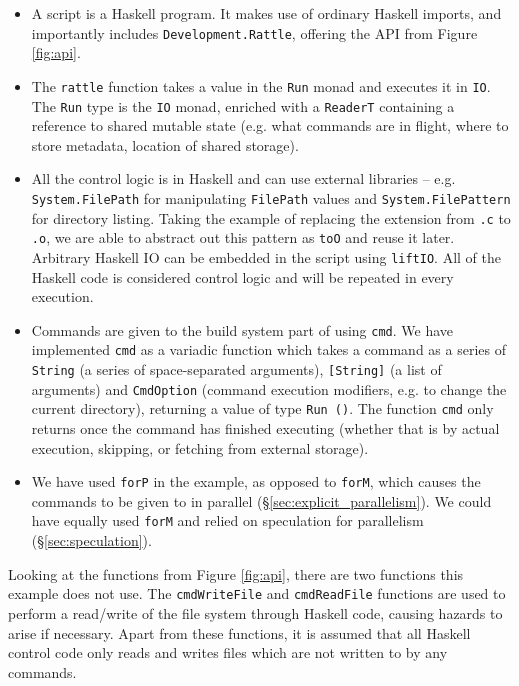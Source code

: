 \begin{itemize}
\item A \Rattle script is a Haskell program. It makes use of ordinary Haskell imports, and importantly includes \texttt{Development.Rattle}, offering the API from Figure \ref{fig:api}.
\item The \texttt{rattle} function takes a value in the \texttt{Run} monad and executes it in \texttt{IO}. The \texttt{Run} type is the \texttt{IO} monad, enriched with a \texttt{ReaderT} \cite{mtl} containing a reference to shared mutable state (e.g. what commands are in flight, where to store metadata, location of shared storage).
\item All the control logic is in Haskell and can use external libraries -- e.g. \texttt{System.FilePath} for manipulating \texttt{FilePath} values and \texttt{System.FilePattern} for directory listing. Taking the example of replacing the extension from \texttt{.c} to \texttt{.o}, we are able to abstract out this pattern as \texttt{toO} and reuse it later. Arbitrary Haskell IO can be embedded in the script using \texttt{liftIO}. All of the Haskell code is considered control logic and will be repeated in every execution.
\item Commands are given to the build system part of \Rattle using \texttt{cmd}. We have implemented \texttt{cmd} as a variadic function \cite{variadic_functions} which takes a command as a series of \texttt{String} (a series of space-separated arguments), \texttt{[String]} (a list of arguments) and \texttt{CmdOption} (command execution modifiers, e.g. to change the current directory), returning a value of type \texttt{Run ()}. The function \texttt{cmd} only returns once the command has finished executing (whether that is by actual execution, skipping, or fetching from external storage).
\item We have used \texttt{forP} in the example, as opposed to \texttt{forM}, which causes the commands to be given to \Rattle in parallel (\S\ref{sec:explicit_parallelism}). We could have equally used \texttt{forM} and relied on speculation for parallelism (\S\ref{sec:speculation}).
\end{itemize}

Looking at the functions from Figure \ref{fig:api}, there are two functions this example does not use. The \texttt{cmdWriteFile} and \texttt{cmdReadFile} functions are used to perform a read/write of the file system through Haskell code, causing hazards to arise if necessary. Apart from these functions, it is assumed that all Haskell control code only reads and writes files which are not written to by any commands.

